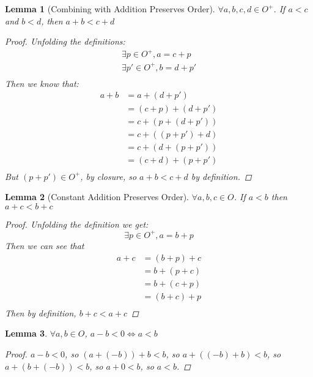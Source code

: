 \documentclass{article}
\newtheorem{lem}{Lemma}
\begin{document}
  \begin{lem}[Combining with Addition Preserves Order] $\forall a, b, c, d \in O^+$. If $a < c$ and $b < d$, then $a + b < c + d$
    \begin{proof}
      Unfolding the definitions:
      \begin{align*}
        \exists p \in O^+, a = c + p \\
        \exists p'\in O^+, b = d + p'\\
      \end{align*}
      Then we know that:
      \begin{align*}
        a + b &= a + (d + p')\\
              &= (c + p) + (d + p')\\
              &= c + (p + (d + p'))\\
              &= c + ((p + p') + d)\\
              &= c + (d + (p + p'))\\
              &= (c + d) + (p + p')\\
      \end{align*}
      But $(p+p') \in O^+$, by closure, so $a + b < c + d$ by definition.
    \end{proof}   
  \end{lem}
  \begin{lem}[Constant Addition Preserves Order]\label{ltacons} $\forall a, b, c \in O$. If $a < b$ then $a + c < b + c$
    \begin{proof}
      Unfolding the definition we get:
      \begin{equation*}
        \exists p \in O^+, a = b + p
      \end{equation*}
      Then we can see that
      \begin{align*}
        a + c &= (b + p) + c\\
              &= b + (p + c)\\
              &= b + (c + p)\\
              &= (b + c) + p\\
      \end{align*}
      Then by definition, $b + c < a + c$
    \end{proof} 
  \end{lem}
  \begin{lem}\label{subtozero} $\forall a, b \in O$,  $a - b < 0 \iff a < b$
    \begin{proof}
      $a - b < 0$, so $(a + (-b)) + b < b$, so $a + ((-b) + b) < b$, so $a + (b + (-b)) < b$, so $a + 0 < b$, so $a < b$.
    \end{proof}
  \end{lem}
\end{document}
